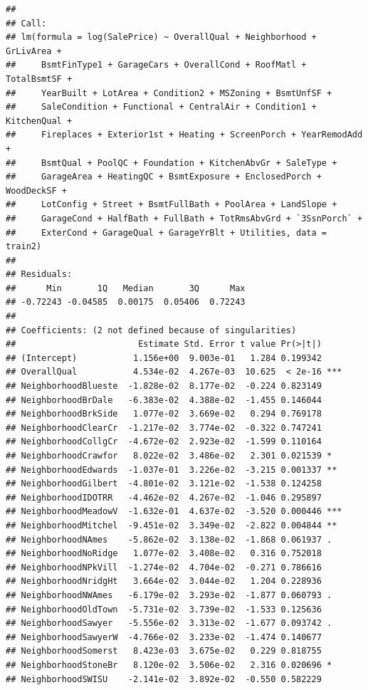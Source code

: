 \documentclass[american,]{article}
\theoremstyle{definition}
\theoremstyle{definition}
\theoremstyle{definition}
\theoremstyle{remark}
\begin{document}
\begin{verbatim}
## 
## Call:
## lm(formula = log(SalePrice) ~ OverallQual + Neighborhood + GrLivArea + 
##     BsmtFinType1 + GarageCars + OverallCond + RoofMatl + TotalBsmtSF + 
##     YearBuilt + LotArea + Condition2 + MSZoning + BsmtUnfSF + 
##     SaleCondition + Functional + CentralAir + Condition1 + KitchenQual + 
##     Fireplaces + Exterior1st + Heating + ScreenPorch + YearRemodAdd + 
##     BsmtQual + PoolQC + Foundation + KitchenAbvGr + SaleType + 
##     GarageArea + HeatingQC + BsmtExposure + EnclosedPorch + WoodDeckSF + 
##     LotConfig + Street + BsmtFullBath + PoolArea + LandSlope + 
##     GarageCond + HalfBath + FullBath + TotRmsAbvGrd + `3SsnPorch` + 
##     ExterCond + GarageQual + GarageYrBlt + Utilities, data = train2)
## 
## Residuals:
##      Min       1Q   Median       3Q      Max 
## -0.72243 -0.04585  0.00175  0.05406  0.72243 
## 
## Coefficients: (2 not defined because of singularities)
##                        Estimate Std. Error t value Pr(>|t|)    
## (Intercept)           1.156e+00  9.003e-01   1.284 0.199342    
## OverallQual           4.534e-02  4.267e-03  10.625  < 2e-16 ***
## NeighborhoodBlueste  -1.828e-02  8.177e-02  -0.224 0.823149    
## NeighborhoodBrDale   -6.383e-02  4.388e-02  -1.455 0.146044    
## NeighborhoodBrkSide   1.077e-02  3.669e-02   0.294 0.769178    
## NeighborhoodClearCr  -1.217e-02  3.774e-02  -0.322 0.747241    
## NeighborhoodCollgCr  -4.672e-02  2.923e-02  -1.599 0.110164    
## NeighborhoodCrawfor   8.022e-02  3.486e-02   2.301 0.021539 *  
## NeighborhoodEdwards  -1.037e-01  3.226e-02  -3.215 0.001337 ** 
## NeighborhoodGilbert  -4.801e-02  3.121e-02  -1.538 0.124258    
## NeighborhoodIDOTRR   -4.462e-02  4.267e-02  -1.046 0.295897    
## NeighborhoodMeadowV  -1.632e-01  4.637e-02  -3.520 0.000446 ***
## NeighborhoodMitchel  -9.451e-02  3.349e-02  -2.822 0.004844 ** 
## NeighborhoodNAmes    -5.862e-02  3.138e-02  -1.868 0.061937 .  
## NeighborhoodNoRidge   1.077e-02  3.408e-02   0.316 0.752018    
## NeighborhoodNPkVill  -1.274e-02  4.704e-02  -0.271 0.786616    
## NeighborhoodNridgHt   3.664e-02  3.044e-02   1.204 0.228936    
## NeighborhoodNWAmes   -6.179e-02  3.293e-02  -1.877 0.060793 .  
## NeighborhoodOldTown  -5.731e-02  3.739e-02  -1.533 0.125636    
## NeighborhoodSawyer   -5.556e-02  3.313e-02  -1.677 0.093742 .  
## NeighborhoodSawyerW  -4.766e-02  3.233e-02  -1.474 0.140677    
## NeighborhoodSomerst   8.423e-03  3.675e-02   0.229 0.818755    
## NeighborhoodStoneBr   8.120e-02  3.506e-02   2.316 0.020696 *  
## NeighborhoodSWISU    -2.141e-02  3.892e-02  -0.550 0.582229    

\end{verbatim}
\end{document}
